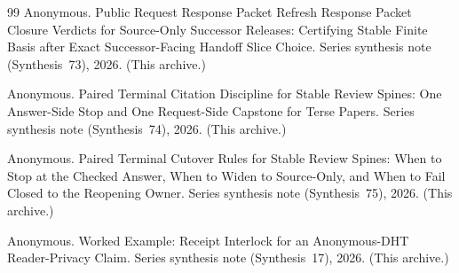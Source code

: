 \documentclass[11pt]{article}
\begin{document}
\begin{thebibliography}{99}
Anonymous.
\newblock Public Request Response Packet Refresh Response Packet Closure Verdicts for Source-Only Successor Releases: Certifying Stable Finite Basis after Exact Successor-Facing Handoff Slice Choice.
\newblock Series synthesis note (Synthesis~73), 2026. (This archive.)

Anonymous.
\newblock Paired Terminal Citation Discipline for Stable Review Spines: One Answer-Side Stop and One Request-Side Capstone for Terse Papers.
\newblock Series synthesis note (Synthesis~74), 2026. (This archive.)

Anonymous.
\newblock Paired Terminal Cutover Rules for Stable Review Spines: When to Stop at the Checked Answer, When to Widen to Source-Only, and When to Fail Closed to the Reopening Owner.
\newblock Series synthesis note (Synthesis~75), 2026. (This archive.)

Anonymous.
\newblock Worked Example: Receipt Interlock for an Anonymous-DHT Reader-Privacy Claim.
\newblock Series synthesis note (Synthesis~17), 2026. (This archive.)

\end{thebibliography}
\end{document}
